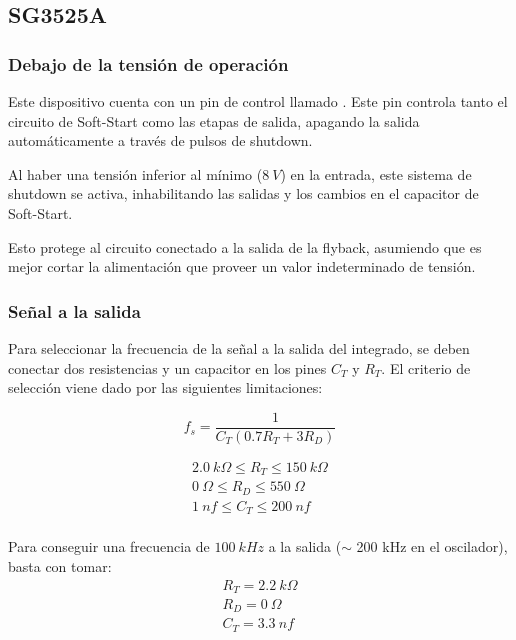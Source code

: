 %
%
%

\subsection{SG3525A}

\subsubsection{Debajo de la tensión de operación}

Este dispositivo cuenta con un pin de control llamado . Este pin controla tanto el circuito de Soft-Start como las etapas de salida, apagando la salida automáticamente a través de pulsos de shutdown.

Al haber una tensión inferior al mínimo ($8 \ V$) en la entrada, este sistema de shutdown se activa, inhabilitando las salidas y los cambios en el capacitor de Soft-Start.

Esto protege al circuito conectado a la salida de la flyback, asumiendo que es mejor cortar la alimentación que proveer un valor indeterminado de tensión.

\subsubsection{Señal a la salida}

Para seleccionar la frecuencia de la señal a la salida del integrado, se deben conectar dos resistencias y un capacitor en los pines $C_T$ y $R_T$. El criterio de selección viene dado por las siguientes limitaciones:

\begin{equation}
	f_s = \frac{1}{C_T \left( 0.7 R_T + 3 R_D \right)}
\end{equation}

\begin{equation*}
\begin{gathered}
2.0 \ k\Omega \leqslant R_T \leqslant 150 \ k\Omega \\
0 \ \Omega \leqslant R_D \leqslant 550 \ \Omega \\
1 \ nf \leqslant C_T \leqslant 200 \ nf \\
\end{gathered}
\end{equation*}

Para conseguir una frecuencia de $100 \ kHz$ a la salida ($\sim$ 200 kHz en el oscilador), basta con tomar:
\begin{equation}
\begin{gathered}
R_T = 2.2 \ k\Omega \\
R_D = 0 \ \Omega \\
C_T = 3.3 \ nf \\
\end{gathered}
\end{equation}


